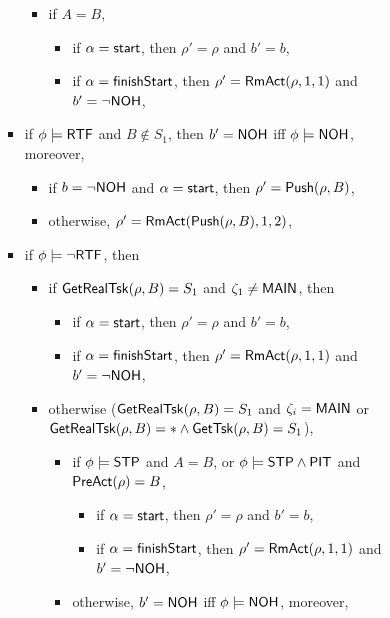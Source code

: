\begin{itemize}
\begin{itemize}
\begin{itemize}
\begin{itemize}
\begin{itemize}
\begin{itemize}
\begin{itemize}
                					\item if $A = B$, 
									\begin{itemize}
										\item if $\alpha = {\mathsf{start} }$, then $\rho' = \rho$ and $b' = b$, 
										\item if $\alpha = {\mathsf{finishStart} }$, then $\rho' = \mathsf{RmAct}(\rho, 1, 1)$ and $b' = \neg {\sf NOH}$, 
									\end{itemize}
                				\end{itemize}
					\item if $\phi \models {\sf RTF}$ and $B \notin S_1$, then $b' = {\sf NOH}$ iff $\phi \models {\sf NOH}$, moreover,
					\begin{itemize}
						\item if $b = \neg {\sf NOH}$ and $\alpha = {\mathsf{start} }$, then $\rho'=\mathsf{Push}(\rho, B)$,
						\item otherwise, $\rho' = \mathsf{RmAct}(\mathsf{Push}(\rho, B), 1, 2)$, 
					\end{itemize}
					\item if $\phi \models \neg {\sf RTF}$, then
					\begin{itemize}
						\item if $\mathsf{GetRealTsk}(\rho,B) = S_1$ and $\zeta_1 \neq {\sf MAIN}$, then 
						\begin{itemize}
							\item if $\alpha = {\mathsf{start} }$, then $\rho' = \rho$ and $b' = b$,
							\item if $\alpha = {\mathsf{finishStart} }$, then $\rho' = \mathsf{RmAct}(\rho, 1, 1)$ and $b' = \neg {\sf NOH}$,
						\end{itemize}
						\item otherwise ($\mathsf{GetRealTsk}(\rho,B) = S_1$ and $\zeta_i = {\sf MAIN}$ or $\mathsf{GetRealTsk}(\rho,B) = * \wedge\mathsf{GetTsk}(\rho,B) = S_1$), 
						\begin{itemize}
							\item if $\phi\models{\sf STP}$ and $A = B$, or $\phi \models{\sf STP}\wedge{\sf PIT}$ and $\mathsf{PreAct}(\rho) = B$, 
							\begin{itemize}
								\item if $\alpha = {\mathsf{start} }$, then $\rho' = \rho$ and $b' = b$,
								\item if $\alpha = {\mathsf{finishStart} }$, then $\rho' = \mathsf{RmAct}(\rho, 1, 1)$ and $b' = \neg {\sf NOH}$,
							\end{itemize}
							\item otherwise, $b' = {\sf NOH}$ iff $\phi \models {\sf NOH}$, moreover, 

\end{itemize}
\end{itemize}
\end{itemize}
\end{itemize}
\end{itemize}
\end{itemize}
\end{itemize}
\end{itemize}

